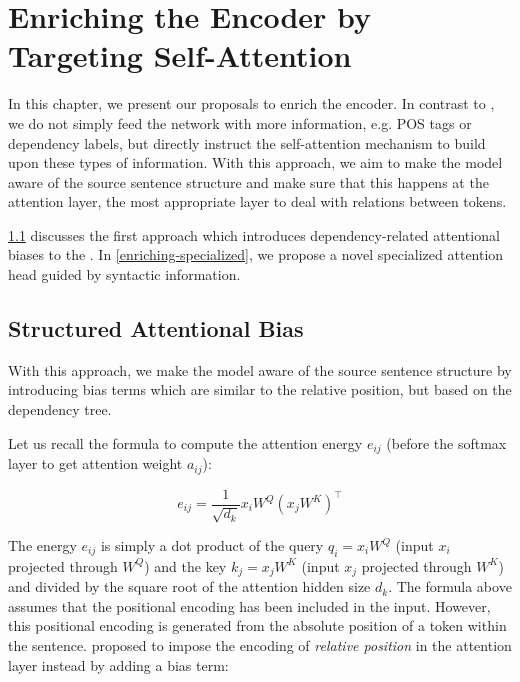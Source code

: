 \chapter{Enriching the Encoder by Targeting Self-Attention}
\label{enriching}

In this chapter, we present our proposals to enrich the encoder.
In contrast to \citeauthor{sennrich2016linguistic}, we do not simply feed the network with more information, e.g. POS tags or dependency labels, but directly instruct the self-attention mechanism to build upon these types of information.
With this approach, we aim to make the model aware of the source sentence structure and make sure that this happens at the attention layer, the most appropriate layer to deal with relations between tokens.

\cref{enriching-structure} discusses the first approach which introduces dependency-related attentional biases to the \transformer. 
In \cref{enriching-specialized}, we propose a novel specialized attention head guided by syntactic information.

\section{Structured Attentional Bias}
\label{enriching-structure}

With this approach, we make the \transformer model aware of the source sentence structure by introducing bias terms which are similar to the relative position, but based on the dependency tree.


Let us recall the formula to compute the attention energy $e_{ij}$ (before the softmax layer to get attention weight $a_{ij}$):

\begin{equation}
    e_{ij}=\frac{1}{\sqrt{d_k}} x_i W^Q (x_j W^K)^\top
\end{equation}

The energy $e_{ij}$ is simply a dot product of the query $q_i=x_i W^Q$ (input $x_i$ projected through $W^Q$) and the key $k_j=x_j W^K$ (input $x_j$ projected through $W^K$) and divided by the square root of the attention hidden size $d_k$.
The formula above assumes that the positional encoding has been included in the input.
However, this positional encoding is generated from the absolute position of a token within the sentence. \cite{DBLP:conf/naacl/ShawUV18} proposed to impose the encoding of \textit{relative position} in the attention layer instead by adding a bias term:

